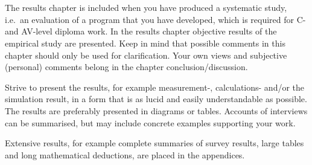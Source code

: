 \section{}\label{sec:result}
The results chapter is included when you have produced a systematic study, 
i.e.\ an evaluation of a program that you have developed, which is required for
C- and AV-level diploma work. In the results chapter objective results of the
empirical study are presented. Keep in mind that possible comments in this
chapter should only be used for clarification. Your own views and subjective
(personal) comments belong in the chapter conclusion/discussion.

Strive to present the results, for example measurement-, calculations- and/or
the simulation result, in a form that is as lucid and easily understandable as
possible. The results are preferably presented in diagrams or tables. Accounts
of interviews can be summarised, but may include concrete examples supporting
your work.

Extensive results, for example complete summaries of survey results, large
tables and long mathematical deductions, are placed in the appendices.

